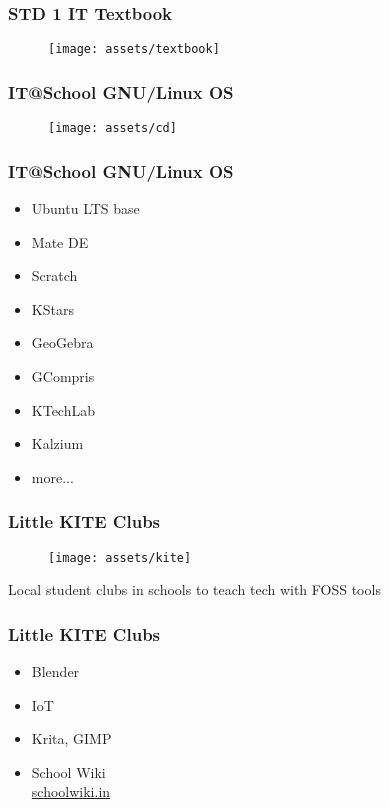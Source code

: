 \documentclass{beamer}
\begin{document}
\begin{frame}
\frametitle{STD 1 IT Textbook}
\begin{figure}
	\texttt{[image: assets/textbook]}
\end{figure}
\end{frame}

\begin{frame}
\frametitle{IT@School GNU/Linux OS}
\begin{figure}
	\texttt{[image: assets/cd]}
\end{figure}
\end{frame}

\begin{frame}
\frametitle{IT@School GNU/Linux OS}
\begin{itemize}
	\item Ubuntu LTS base
	\item Mate DE
	\item Scratch
	\item KStars
	\item GeoGebra
	\item GCompris
	\item KTechLab
	\item Kalzium
	\item more...
\end{itemize}
\end{frame}

\begin{frame}
\frametitle{Little KITE Clubs}
\begin{figure}
	\texttt{[image: assets/kite]}
\end{figure}
{\centering Local student clubs in schools to teach tech with FOSS tools}
\end{frame}

\begin{frame}
\frametitle{Little KITE Clubs}
\begin{itemize}
	\item Blender
	\item IoT
	\item Krita, GIMP
	\item School Wiki \\ \href{https://schoolwiki.in}{schoolwiki.in}
\end{itemize}
\end{frame}
\end{document}
